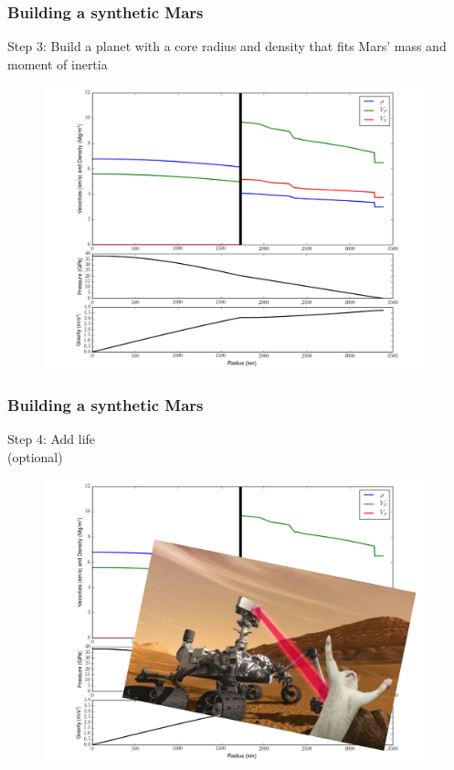 \documentclass[compress,framenumber]{beamer}
\begin{document}
\begin{frame}
  \frametitle{Building a synthetic Mars}
  Step 3: Build a planet with a core radius and density that fits
  Mars' mass and moment of inertia
  \vspace{-0.5em}
  \begin{figure}
    \includegraphics[width=0.7\linewidth]{figures/example_profile.pdf}
  \end{figure}
\end{frame}

\begin{frame}
  \frametitle{Building a synthetic Mars}
  Step 4: Add life \\(optional)
  \vspace{-0.5em}
  \begin{figure}
    \includegraphics[width=0.7\linewidth]{figures/example_profile_with_life.pdf}
  \end{figure}
\end{frame}
\end{document}
